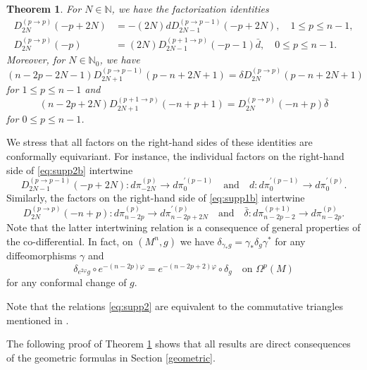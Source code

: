 \documentclass[a4paper,12pt,reqno]{amsart}
\newtheorem{theorem}{Theorem}
\numberwithin{theorem}{subsection}
\numberwithin{equation}{section}
\begin{document}
\begin{theorem}\label{SuppFact} For $N \in {\mathbb{N}}$, we have the factorization identities
\begin{align}
   D^{(p \to p)}_{2N}(-p\!+\!2N) & = -(2N) {d} D^{(p \to p-1)}_{2N-1}(-p\!+\!2N), \quad 1 \le p \le n-1,
   \label{eq:supp2b} \\
   D^{(p \to p)}_{2N}(-p) & = (2N)  D^{(p+1 \to p)}_{2N-1}(-p\!-\!1) \bar{d}, \quad 0 \le p \le
   n-1. \label{eq:supp2}
\end{align}
Moreover, for $N \in {\mathbb{N}}_0$, we have
\begin{equation}\label{eq:supp1}
   (n\!-\!2p\!-\!2N\!-\!1) D^{(p \to p-1)}_{2N+1}(p\!-\!n\!+\!2N\!+\!1) =
   \delta D^{(p\to p)}_{2N}(p\!-\!n\!+\!2N\!+\!1)
\end{equation}
for $1 \le p \le n-1$ and
\begin{equation} \label{eq:supp1b}
   (n\!-\!2p\!+\!2N) D_{2N+1}^{(p+1 \to p)}(-n\!+\!p\!+\!1) =
   D_{2N}^{(p \to p)}(-n\!+\!p) \bar{\delta}
\end{equation}
for $0 \le p \le n-1$.
\end{theorem}

We stress that all factors on the right-hand sides of these identities are
conformally equivariant. For instance, the individual factors on the right-hand
side of \eqref{eq:supp2b} intertwine
$$
   D_{2N-1}^{(p \to p-1)}(-p\!+\!2N): {d} \pi^{(p)}_{-2N} \to {d} \pi_0^{\prime(p-1)}
   \quad \mbox{and} \quad
   d: {d}\pi_0^{\prime (p-1)} \to {d}\pi_0^{\prime(p)}.
$$
Similarly, the factors on the right-hand side of \eqref{eq:supp1b} intertwine
$$
   D_{2N}^{(p \to p)}(-n\!+\!p): {d} \pi^{(p)}_{n-2p} \to {d} \pi_{n-2p+2N}^{\prime (p)}
  \quad \mbox{and} \quad \bar{\delta}: {d} \pi^{(p+1)}_{n-2p-2} \to {d} \pi_{n-2p}^{(p)}.
$$
Note that the latter intertwining relation is a consequence of general
properties of the co-differential. In fact, on $(M^n,g)$ we have
$\delta_{\gamma_*g} = \gamma_* \delta_g \gamma^*$ for any diffeomorphisms
$\gamma$ and
$$
   \delta_{e^{2\varphi} g} \circ e^{-(n-2p)\varphi} = e^{-(n-2p+2)\varphi} \circ
   \delta_g \quad \mbox{on $\Omega^p(M)$}
$$
for any conformal change of $g$.

Note that the relations \eqref{eq:supp2} are equivalent to the commutative
triangles mentioned in \cite[page 593]{Juhl0}.

The following proof of Theorem \ref{SuppFact} shows that all results are direct
consequences of the geometric formulas in Section \ref{geometric}.
\end{document}
